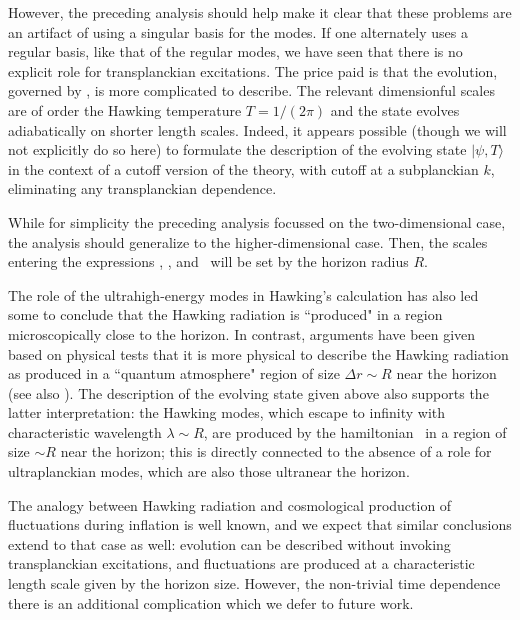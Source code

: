 However, the preceding analysis should help make it clear that these problems are an artifact of using a singular basis for the modes.  If one alternately uses a regular basis, like that of the regular modes, we have seen that there is no explicit role for transplanckian excitations.  The price paid is that the evolution, governed by \hamreg, is more complicated to describe. 
The relevant dimensionful scales are of order the Hawking temperature $T=1/(2\pi)$ and the state evolves adiabatically on shorter length scales.  Indeed, it appears possible (though we will not explicitly do so here) to formulate the description of the evolving state  $|\psi,T\rangle$ in the context of a cutoff version of the theory, with cutoff at a subplanckian $k$, eliminating any transplanckian dependence.  

While for simplicity the preceding analysis focussed on the two-dimensional case, the analysis should generalize to the higher-dimensional case.  Then, the scales entering the expressions \hamreg, \ABdefs, and \Bstraight\ will be set by the horizon radius $R$.  

The role of the ultrahigh-energy modes in Hawking's calculation has also led some to conclude that the Hawking radiation is ``produced" in a region microscopically close to the horizon.  In contrast, arguments have been given based on physical tests that it is more physical to describe the Hawking radiation as produced in a ``quantum atmosphere" region of size $\Delta r\sim R$ near the horizon (see also ).  The description of the evolving state given above also supports the latter interpretation:  the Hawking modes, which escape to infinity with characteristic wavelength $\lambda\sim R$, are produced by the hamiltonian \hamreg\ in a region of size $\sim R$ near the horizon; this is directly connected to the absence of a role for ultraplanckian modes, which are also those ultranear the horizon.

The analogy between Hawking radiation and cosmological production of fluctuations during inflation is well known, and we expect that similar conclusions extend to that case as well: evolution can be described without invoking transplanckian excitations, and fluctuations are produced at a characteristic length scale given by the horizon size.  However, the non-trivial time dependence there is an additional complication which we defer to future work.

